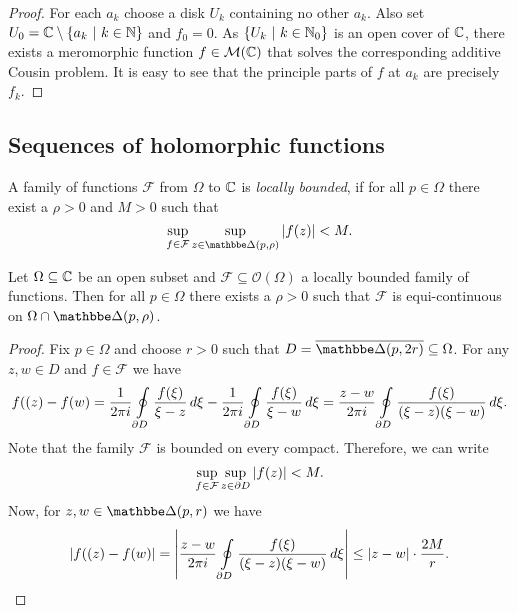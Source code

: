 \begin{proof}
For each $a_k$ choose a disk $U_k$ containing no other $a_k$. Also
set $U_0 = \mathbb{C} \setminus \left\{a_k~\middle\vert~k \in \mathbb{N}\right\}$ and $f_0 = 0$. As
$\left\{U_k~\middle\vert~k \in \mathbb{N}_0\right\}$ is an open cover of $\mathbb{C}$, there exists a
meromorphic function $f \in \mathcal{M}(\mathbb{C})$ that solves the
corresponding additive Cousin problem. It is easy to see that the
principle parts of $f$ at $a_k$ are precisely $f_k$.
\end{proof}

\newpage

\subsection{Sequences of holomorphic functions}


\begin{definicija}
A family of functions $\mathcal{F}$ from $\Omega$ to $\mathbb{C}$ is
\emph{locally bounded}, if for all
$p \in \Omega$ there exist a $\rho > 0$ and $M > 0$ such that
\[
\sup_{f \in \mathcal{F}} \sup_{z \in \dsk(p, \rho)} \abs{f(z)} < M.
\]
\end{definicija}

\begin{lema}
\label{hol:lm:loc_equi}
Let $\Omega \subseteq \mathbb{C}$ be an open subset and
$\mathcal{F} \subseteq \mathcal{O}(\Omega)$ a locally bounded
family of functions. Then for all $p \in \Omega$ there exists a
$\rho > 0$ such that $\mathcal{F}$ is equi-continuous on
$\Omega \cap \dsk(p, \rho)$.
\end{lema}

\begin{proof}
Fix $p \in \Omega$ and choose $r > 0$ such that
$D = \oline{\dsk(p, 2r)} \subseteq \Omega$. For any $z, w \in D$
and $f \in \mathcal{F}$ we have
\[
f((z) - f(w) =
\frac{1}{2 \pi i} \oint\limits_{\partial D} \frac{f(\xi)}{\xi-z}\,d\xi -
\frac{1}{2 \pi i} \oint\limits_{\partial D} \frac{f(\xi)}{\xi-w}\,d\xi =
\frac{z-w}{2 \pi i} \oint\limits_{\partial D}
\frac{f(\xi)}{(\xi-z)(\xi-w)}\,d\xi.
\]
Note that the family $\mathcal{F}$ is bounded on every compact.
Therefore, we can write
\[
\sup_{f \in \mathcal{F}} \sup_{z \in \partial D} \left\lvert f(z)\right\rvert < M.
\]
Now, for $z, w \in \dsk(p, r)$ we have
\[
\left\lvert f((z) - f(w)\right\rvert =
\left\lvert \frac{z-w}{2 \pi i} \oint\limits_{\partial D}
\frac{f(\xi)}{(\xi-z)(\xi-w)}\,d\xi\right\rvert \leq
\left\lvert z-w\right\rvert \cdot \frac{2M}{r}. \qedhere
\]
\end{proof}

